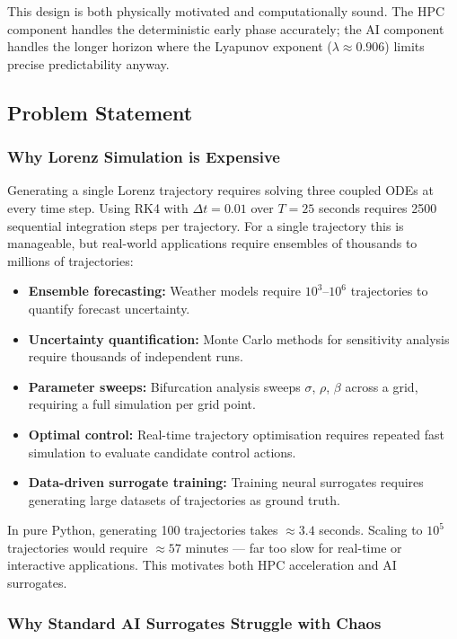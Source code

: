 \documentclass[11pt,a4paper]{article}
\begin{document}
This design is both physically motivated and computationally sound. The HPC component
handles the deterministic early phase accurately; the AI component handles the longer
horizon where the Lyapunov exponent ($\lambda \approx 0.906$) limits precise
predictability anyway.


\subsection{Problem Statement}

\subsubsection{Why Lorenz Simulation is Expensive}

Generating a single Lorenz trajectory requires solving three coupled ODEs at every
time step. Using RK4 with $\Delta t = 0.01$ over $T = 25$ seconds requires 2500
sequential integration steps per trajectory. For a single trajectory this is
manageable, but real-world applications require ensembles of thousands to millions
of trajectories:

\begin{itemize}
  \item \textbf{Ensemble forecasting:} Weather models require $10^3$--$10^6$
        trajectories to quantify forecast uncertainty.
  \item \textbf{Uncertainty quantification:} Monte Carlo methods for sensitivity
        analysis require thousands of independent runs.
  \item \textbf{Parameter sweeps:} Bifurcation analysis sweeps $\sigma$, $\rho$,
        $\beta$ across a grid, requiring a full simulation per grid point.
  \item \textbf{Optimal control:} Real-time trajectory optimisation requires
        repeated fast simulation to evaluate candidate control actions.
  \item \textbf{Data-driven surrogate training:} Training neural surrogates requires
        generating large datasets of trajectories as ground truth.
\end{itemize}

In pure Python, generating 100 trajectories takes $\approx 3.4$ seconds. Scaling to
$10^5$ trajectories would require $\approx 57$ minutes --- far too slow for real-time
or interactive applications. This motivates both HPC acceleration and AI surrogates.

\subsubsection{Why Standard AI Surrogates Struggle with Chaos}
\end{document}
